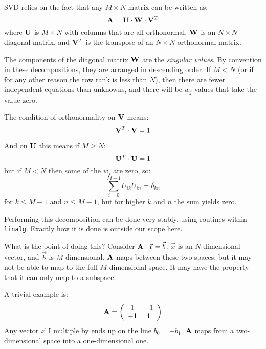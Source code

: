 SVD  relies on the fact that any $M\times N$ matrix can be written
as:
\begin{equation}
{\bf A} = {\bf U}\cdot{\bf W}\cdot{\bf V}^T
\end{equation}
where ${\bf U}$ is $M\times N$ with columns that are all orthonormal,
${\bf W}$ is an $N\times N$ diagonal matrix, and ${\bf V}^T$ is the
transpose of an $N \times N$ orthonormal matrix.

The components of the diagonal matrix ${\bf W}$ are the {\it singular
  values}.  By convention in these decompositions, they are arranged
in descending order. If $M<N$ (or if for any other reason the row rank
is less than $N$), then there are fewer independent equations than
unknowns, and there will be $w_j$ values that take the value zero.

The condition of orthonormality on ${\bf V}$ means:
\begin{equation}
{\bf V}^T \cdot {\bf V} = 1
\end{equation}

And on ${\bf U}$ this means if $M\ge N$:
\begin{equation}
{\bf U}^T \cdot {\bf U} = 1
\end{equation}
but if $M<N$ then some of the $w_j$ are zero, so:
\begin{equation}
\sum_{i=0}^{M-1} U_{ik} U_{in} = \delta_{kn}
\end{equation}
for $k\le M-1$ and $n\le M-1$, but for higher $k$ and $n$ the sum
yields zero.

Performing this decomposition can be done very stably, using routines
within {\tt linalg}. Exactly how it is done is outside our scope here. 

What is the point of doing this? Consider ${\bf A}\cdot\vec{x} =
\vec{b}$. $\vec{x}$ is an $N$-dimensional vector, and $\vec{b}$ is
$M$-dimensional. ${\bf A}$ maps between these two spaces, but it may
not be able to map to the full $M$-dimensional space.  It may have the
property that it can only map to a subspace.

A trivial example is:
\begin{equation}
  {\bf A} = \left(\begin{array}{cc}
    1 & -1\cr
    -1 & 1
    \end{array}\right)
\end{equation}
Any vector $\vec{x}$ I multiple by ends up on the line $b_0 =
-b_1$. ${\bf A}$ maps from a two-dimensional space into a
one-dimensional one.


